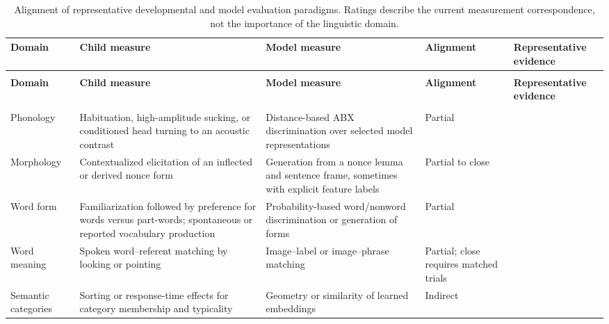 \begingroup
\small
\setlength{\tabcolsep}{3.5pt}
\begin{longtable}{@{}>{\raggedright\arraybackslash}p{}>{\raggedright\arraybackslash}p{}>{\raggedright\arraybackslash}p{}>{\raggedright\arraybackslash}p{}>{\raggedright\arraybackslash}p{}@{}}
\caption[Alignment of developmental and model evaluation]{Alignment of representative developmental and model evaluation paradigms. Ratings describe the current measurement correspondence, not the importance of the linguistic domain.}\label{tab:litreview:alignment}\\
\toprule
\textbf{Domain} & \textbf{Child measure} & \textbf{Model measure} & \textbf{Alignment} & \textbf{Representative evidence} \\
\midrule
\endfirsthead
\multicolumn{5}{@{}l}{\small Table~\ref{tab:litreview:alignment} continued}\\
\toprule
\textbf{Domain} & \textbf{Child measure} & \textbf{Model measure} & \textbf{Alignment} & \textbf{Representative evidence} \\
\midrule
\endhead
\midrule
\multicolumn{5}{r@{}}{\small Continued on next page}\\
\endfoot
\bottomrule
\endlastfoot
Phonology & Habituation, high-amplitude sucking, or conditioned head turning to an acoustic contrast & Distance-based ABX discrimination over selected model representations & Partial & \citep{Eimas1971,Werker1984,Schatz2013,matusevych2023infant} \\
Morphology & Contextualized elicitation of an inflected or derived nonce form & Generation from a nonce lemma and sentence frame, sometimes with explicit feature labels & Partial to close & \citep{BerkoGleason1958,weissweiler2023counting,anh2024morphology} \\
Word form & Familiarization followed by preference for words versus part-words; spontaneous or reported vocabulary production & Probability-based word/nonword discrimination or generation of forms & Partial & \citep{saffran1996statistical,Aslin1998,nguyen2022word} \\
Word meaning & Spoken word--referent matching by looking or pointing & Image--label or image--phrase matching & Partial; close requires matched trials & \citep{bergelson_at_2012,Lany2011,Wang2025} \\
Semantic categories & Sorting or response-time effects for category membership and typicality & Geometry or similarity of learned embeddings & Indirect & \citep{Lenci2022} \\

\end{longtable}
